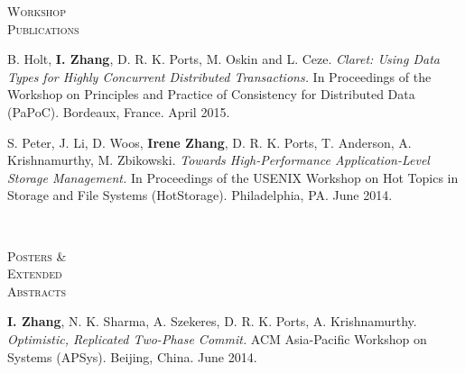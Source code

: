 \documentclass[10pt,times]{report}
\newlength{\sectiongap}
\newlength{\sectioncolwidth}
\newlength{\colgap}
\newlength{\stuffwidth}
\newenvironment{rtable}{
  \begin{minipage}{\textwidth}
  }{
  \end{minipage}
}
\newenvironment{rsection}[1]{
  \begin{minipage}[t]{\sectioncolwidth}
    \textsc{#1}
  \end{minipage}
  \hspace{\colgap}
  \begin{minipage}[t]{\stuffwidth}
  }{
    \removelastskip
  \end{minipage}
  \\[\sectiongap]
}
\begin{document}
\begin{rtable}
  
  \begin{rsection}{Workshop\\Publications}
    B. Holt, \textbf{I. Zhang}, D. R. K. Ports, M. Oskin and L. Ceze.
    \textit{Claret: Using Data Types for Highly Concurrent Distributed
      Transactions.} In Proceedings of the Workshop on Principles and
    Practice of Consistency for Distributed Data (PaPoC).  Bordeaux,
    France. April 2015.\\\vspace{-0.5em}


    S. Peter, J. Li, D. Woos, \textbf{Irene Zhang}, D. R. K. Ports,
    T. Anderson, A. Krishnamurthy, M. Zbikowski. \textit{Towards
      High-Performance Application-Level Storage Management.} In
    Proceedings of the USENIX Workshop on Hot Topics in Storage and
    File Systems (HotStorage). Philadelphia, PA. June
    2014.\\\vspace{-0.5em}
  \end{rsection}

  \begin{rsection}{Posters \&\\Extended\\Abstracts}
    \textbf{I. Zhang}, N. K. Sharma, A. Szekeres, D. R. K. Ports,
    A. Krishnamurthy. \textit{Optimistic, Replicated Two-Phase
      Commit.}  ACM Asia-Pacific Workshop on Systems (APSys). Beijing,
    China. June 2014.\\\vspace{-.5em}
  \end{rsection}
\end{rtable}
\end{document}
